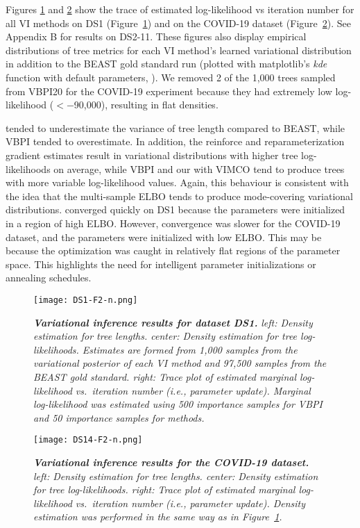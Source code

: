 Figures \ref{fig:DS1} and \ref{fig:DS14} show the trace of estimated log-likelihood vs iteration number for all VI methods on DS1 (Figure~\ref{fig:DS1}) and on the COVID-19 dataset (Figure~\ref{fig:DS14}). See Appendix B for results on DS2-11. These figures also display empirical distributions of tree metrics for each VI method's learned variational distribution in addition to the BEAST gold standard run (plotted with matplotlib's \emph{kde} function with default parameters, \citealt{Hunter:2007}). We removed 2 of the 1,000 trees sampled from VBPI20 for the COVID-19 experiment because they had extremely low log-likelihood ($<-$90,000), resulting in flat densities.

\model tended to underestimate the variance of tree length compared to BEAST, while VBPI tended to overestimate. In addition, the reinforce and reparameterization gradient estimates result in variational distributions with higher tree log-likelihoods on average, while VBPI and our \model with VIMCO tend to produce trees with more variable log-likelihood values. Again, this behaviour is consistent with the idea that the multi-sample ELBO tends to produce mode-covering variational distributions.
%
\model converged quickly on DS1 because the parameters were initialized in a region of high ELBO. However, convergence was slower for the COVID-19 dataset, and the parameters were initialized with low ELBO. This may be because the optimization was caught in relatively flat regions of the parameter space. This highlights the need for intelligent parameter initializations or annealing schedules.

\begin{figure}[t]
    \centering
    \texttt{[image: DS1-F2-n.png]}
    \caption{{\bf \emph{Variational inference results for dataset DS1.}} \emph{\emph{left:} Density estimation for tree lengths.  \emph{center:} Density estimation for tree log-likelihoods. Estimates are formed from 1,000 samples from the variational posterior of each VI method and 97,500 samples from the BEAST gold standard.  \emph{right:} Trace plot of estimated marginal log-likelihood vs.\ iteration number (i.e., parameter update). Marginal log-likelihood was estimated using 500 importance samples for VBPI and 50 importance samples for \model methods.}}
    \label{fig:DS1}
\end{figure}

\begin{figure}[t]
    \centering
    \texttt{[image: DS14-F2-n.png]}
    \caption{{\bf \emph{Variational inference results for the COVID-19 dataset.}} \emph{\emph{left:} Density estimation for tree lengths.  \emph{center:} Density estimation for tree log-likelihoods. \emph{right:} Trace plot of estimated marginal log-likelihood vs.\ iteration number (i.e., parameter update). Density estimation was performed in the same way as in Figure~\ref{fig:DS1}.}}
    \label{fig:DS14}
\end{figure}

